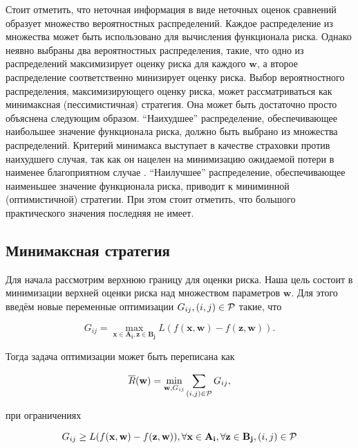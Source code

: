 \documentclass[12pt,a4paper,oneside]{article}
\begin{document}
\par
Стоит отметить, что неточная информация в виде неточных оценок сравнений образует множество вероятностных распределений. 
Каждое распределение из множества может быть использовано для вычисления функционала риска.
Однако неявно выбраны два вероятностных распределения, такие, что одно из распределений максимизирует оценку риска для каждого \(\mathbf{w}\), а второе распределение соответственно минизирует оценку риска. 
Выбор вероятностного распределения, максимизирующего оценку риска, может рассматриваться как минимаксная (пессимистичная) стратегия. 
Она может быть достаточно просто объяснена следующим образом. 
``Наихудшее'' распределение, обеспечивающее наибольшее значение функционала риска, должно быть выбрано из множества распределений. 
Критерий минимакса выступает в качестве страховки против наихудшего случая, так как он нацелен на минимизацию ожидаемой потери в наименее благоприятном случае . 
``Наилучшее'' распределение, обеспечивающее наименьшее значение функционала риска, приводит к миниминной (оптимистичной) стратегии.
При этом стоит отметить, что большого практического значения последняя не имеет. 


\subsection{Минимаксная стратегия}

\par
Для начала рассмотрим верхнюю границу для оценки риска. 
Наша цель состоит в минимизации верхней оценки риска над множеством параметров \(\mathbf{w}\). 
Для этого введём новые переменные оптимизации \(G_{ij}, (i, j) \in \mathcal{P}\) такие, что

\[
G_{ij} = \underset{\mathbf{x} \in \mathbf{A_i}, \mathbf{z} \in \mathbf{B_j}}{\operatorname{max}} L (f (\mathbf{x}, \mathbf{w}) - f(\mathbf{z}, \mathbf{w})). 
\]

\par
Тогда задача оптимизации может быть переписана как

\[
\overline{R}(\mathbf{w}) = \underset{\mathbf{w}, G_{ij}}{\operatorname{min}} \sum \limits_{(i, j) \in \mathcal{P}} G_{ij},
\]

\par
при ограничениях

\[
G_{ij} \geq L (f(\mathbf{x}, \mathbf{w}) - f(\mathbf{z}, \mathbf{w})), \forall \mathbf{x} \in \mathbf{A_i}, \forall \mathbf{z} \in \mathbf{B_j}, (i, j) \in \mathcal{P}
\]
\end{document}
